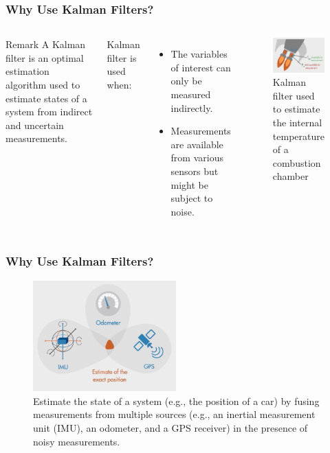 \documentclass{beamer}
\begin{document}
\begin{frame}
\frametitle{Why Use Kalman Filters?}
\begin{columns}
		\begin{block}{Remark}
			A Kalman filter is an optimal estimation algorithm used to estimate states of a system from indirect and uncertain measurements.
		\end{block}
		Kalman filter is used when:
		
			\begin{itemize}
			\item  The variables of interest can only be measured indirectly. 
			\item Measurements are available from various sensors but might be subject to noise.
		\end{itemize}
		
		
		
		\begin{figure}
			\centering
			\includegraphics[width=4.7cm]{example1.png}
			\caption{Kalman filter used to estimate the internal temperature of a combustion chamber}
		\end{figure}
	\end{columns}
\end{frame}

\begin{frame}
	\frametitle{Why Use Kalman Filters?}
	\begin{figure}
		\centering
		\includegraphics[width=5.5cm]{example2.png}
		\caption{Estimate the state of a system (e.g., the position of a car) by fusing measurements from multiple sources (e.g., an inertial measurement unit (IMU), an odometer, and a GPS receiver) in the presence of noisy measurements. }
	\end{figure}
	
\end{frame}
\end{document}
